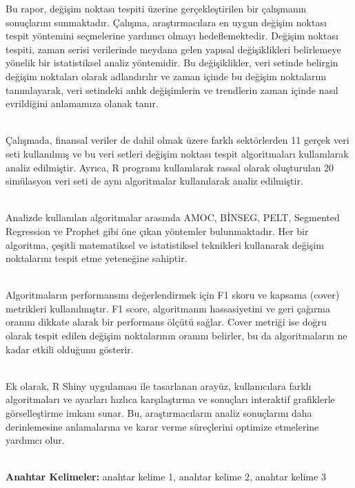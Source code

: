 \documentclass[12pt,twoside]{deuthesis}
\begin{document}
\begin{abstractTR}
	Bu rapor, değişim noktası tespiti üzerine gerçekleştirilen bir çalışmanın sonuçlarını sunmaktadır. Çalışma, araştırmacılara en uygun değişim noktası tespit yöntemini seçmelerine yardımcı olmayı hedeflemektedir. Değişim noktası tespiti, zaman serisi verilerinde meydana gelen yapısal değişiklikleri belirlemeye yönelik bir istatistiksel analiz yöntemidir. Bu değişiklikler, veri setinde belirgin değişim noktaları olarak adlandırılır ve zaman içinde bu değişim noktalarını tanımlayarak, veri setindeki anlık değişimlerin ve trendlerin zaman içinde nasıl evrildiğini anlamamıza olanak tanır.\\
\strut \\
Çalışmada, finansal veriler de dahil olmak üzere farklı sektörlerden 11 gerçek veri seti kullanılmış ve bu veri setleri değişim noktası tespit algoritmaları kullanılarak analiz edilmiştir. Ayrıca, R programı kullanılarak rassal olarak oluşturulan 20 simülasyon veri seti de aynı algoritmalar kullanılarak analiz edilmiştir.\\
\strut \\
Analizde kullanılan algoritmalar arasında AMOC, BİNSEG, PELT, Segmented Regression ve Prophet gibi öne çıkan yöntemler bulunmaktadır. Her bir algoritma, çeşitli matematiksel ve istatistiksel teknikleri kullanarak değişim noktalarını tespit etme yeteneğine sahiptir.\\
\strut \\
Algoritmaların performansını değerlendirmek için F1 skoru ve kapsama (cover) metrikleri kullanılmıştır. F1 score, algoritmanın hassasiyetini ve geri çağırma oranını dikkate alarak bir performans ölçütü sağlar. Cover metriği ise doğru olarak tespit edilen değişim noktalarının oranını belirler, bu da algoritmaların ne kadar etkili olduğunu gösterir.\\
\strut \\
Ek olarak, R Shiny uygulaması ile tasarlanan arayüz, kullanıcılara farklı algoritmaları ve ayarları hızlıca karşılaştırma ve sonuçları interaktif grafiklerle görselleştirme imkanı sunar. Bu, araştırmacıların analiz sonuçlarını daha derinlemesine anlamalarına ve karar verme süreçlerini optimize etmelerine yardımcı olur.\\
\strut \\
\textbf{Anahtar Kelimeler:} anahtar kelime 1, anahtar kelime 2, anahtar kelime 3
\end{abstractTR}
\end{document}
